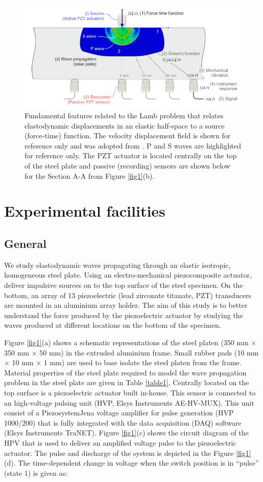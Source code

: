 \documentclass[preprint,3p, 11pt,authoryear]{elsarticle}
\begin{document}
\begin{figure}[h]
     	\centering
\includegraphics[scale= 1.0]{FIG2.pdf} 
\caption{Fundamental features related to the Lamb problem that relates elastodynamic displacements in an elastic half-space to a source (force-time) function. The velocity displacement field is shown for reference only and was adopted from \citet{Selvadurai2019}. P and S waves are highlighted for reference only. The PZT actuator is located centrally on the top of the steel plate and passive (recording) sensors are shown below for the Section A-A from Figure \ref{fig1}(b).}
	\label{fig2} 
\end{figure}
\section{Experimental facilities}
\subsection{General}

We study elastodynamic waves propagating through an elastic isotropic, homogeneous steel plate. Using an electro-mechanical piezocomposite actuator, deliver impulsive sources on to the top surface of the steel specimen. On the bottom, an array of 13 piezoelectric (lead zirconate titanate, PZT) transducers are mounted in an aluminium array holder. The aim of this study is to better understand the force produced by the piezoelectric actuator by studying the waves produced at different locations on the bottom of the specimen.

Figure \ref{fig1}(a) shows a schematic representations of the steel platen (350 mm $\times$ 350 mm $\times$ 50 mm) in the extruded aluminium frame. Small rubber pads (10 mm $\times$ 10 mm $\times$ 1 mm) are used to base isolate the steel platen from the frame. Material properties of the steel plate required to model the wave propagation problem in the steel plate are given in Table \ref{table1}. Centrally located on the top surface is a piezoelectric actuator built in-house.  This sensor is connected to an high-voltage pulsing unit (HVP, Elsys Instruments AE-HV-MUX). This unit consist of a PiezosystemJena voltage amplifier for pulse generation (HVP 1000/200) that is fully integrated with the data acquisition (DAQ) software (Elsys Instruments TraNET). Figure \ref{fig1}(c) shows the circuit diagram of the HPV that is used to deliver an amplified voltage pulse to the piezoelectric actuator. The pulse and discharge of the system is depicted in the Figure \ref{fig1}(d). The time-dependent change in voltage when the switch position is in ``pulse'' (state 1) is given as:
\end{document}

